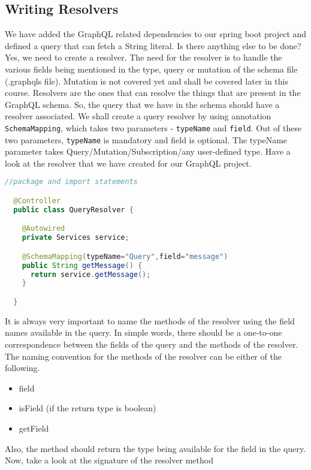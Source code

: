 \documentclass[../main.tex]{subfiles}
\begin{document}
\subsection{Writing Resolvers}
We have added the GraphQL related dependencies to our spring boot project and defined a query that can fetch a String literal. Is there anything else to be done? 
Yes, we need to create a resolver.
The need for the resolver is to handle the various fields being mentioned in the type, query or mutation of the schema file (.graphqls file). 
Mutation is not covered yet and shall be covered later in this course.
Resolvers are the ones that can resolve the things that are present in the GraphQL schema.
So, the query that we have in the schema should have a resolver associated.
We shall create a query resolver by using annotation \lstinline{SchemaMapping}, which takes two parameters - \lstinline{typeName} and \lstinline{field}.
Out of these two parameters, \lstinline{typeName} is mandatory and field is optional.
The typeName parameter takes Query/Mutation/Subscription/any user-defined type. 
Have a look at the resolver that we have created for our GraphQL project.

\begin{lstlisting}[language=java, caption={Resolver example}, label={lst:resolver-example}]
  //package and import statements

  @Controller
  public class QueryResolver {

    @Autowired
    private Services service;

    @SchemaMapping(typeName="Query",field="message")
    public String getMessage() {
      return service.getMessage();
    }

  }

\end{lstlisting}
It is always very important to name the methods of the resolver using the field names available in the query.
In simple words, there should be a one-to-one correspondence between the fields of the query and the methods of the resolver.
The naming convention for the methods of the resolver can be either of the following.

\begin{itemize}
  \item field
  \item isField (if the return type is boolean)
  \item getField
\end{itemize}

Also, the method should return the type being available for the field in the query.
Now, take a look at the signature of the resolver method
\end{document}

